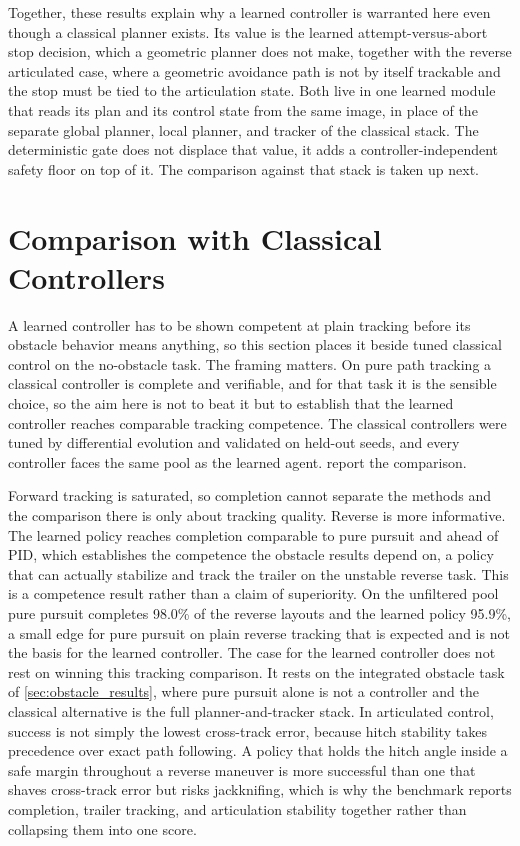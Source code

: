 

Together, these results explain why a learned controller is warranted here even though a classical planner exists. Its value is the learned attempt-versus-abort stop decision, which a geometric planner does not make, together with the reverse articulated case, where a geometric avoidance path is not by itself trackable and the stop must be tied to the articulation state. Both live in one learned module that reads its plan and its control state from the same image, in place of the separate global planner, local planner, and tracker of the classical stack. The deterministic gate does not displace that value, it adds a controller-independent safety floor on top of it. The comparison against that stack is taken up next.

\section{Comparison with Classical Controllers}
\label{sec:benchmark}

A learned controller has to be shown competent at plain tracking before its obstacle behavior means anything, so this section places it beside tuned classical control on the no-obstacle task. The framing matters. On pure path tracking a classical controller is complete and verifiable, and for that task it is the sensible choice, so the aim here is not to beat it but to establish that the learned controller reaches comparable tracking competence. The classical controllers were tuned by differential evolution and validated on held-out seeds, and every controller faces the same pool as the learned agent.  report the comparison.



Forward tracking is saturated, so completion cannot separate the methods and the comparison there is only about tracking quality. Reverse is more informative. The learned policy reaches completion comparable to pure pursuit and ahead of PID, which establishes the competence the obstacle results depend on, a policy that can actually stabilize and track the trailer on the unstable reverse task. This is a competence result rather than a claim of superiority. On the unfiltered pool pure pursuit completes 98.0\% of the reverse layouts and the learned policy 95.9\%, a small edge for pure pursuit on plain reverse tracking that is expected and is not the basis for the learned controller. The case for the learned controller does not rest on winning this tracking comparison. It rests on the integrated obstacle task of \cref{sec:obstacle_results}, where pure pursuit alone is not a controller and the classical alternative is the full planner-and-tracker stack. In articulated control, success is not simply the lowest cross-track error, because hitch stability takes precedence over exact path following. A policy that holds the hitch angle inside a safe margin throughout a reverse maneuver is more successful than one that shaves cross-track error but risks jackknifing, which is why the benchmark reports completion, trailer tracking, and articulation stability together rather than collapsing them into one score.

